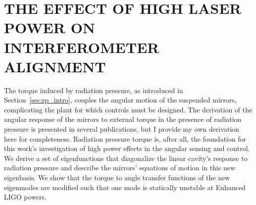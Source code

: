 \chapter{THE EFFECT OF HIGH LASER POWER ON INTERFEROMETER ALIGNMENT}
\label{ch:eigenmodes}



The torque induced by radiation pressure, as introduced in
Section~\ref{sec:rp_intro}, couples the angular motion of the suspended
mirrors, complicating the plant for which controls must be
designed. The derivation of the angular response of the mirrors to
external torque in the presence of radiation pressure is presented in
several publications, but I provide my own derivation here for
completeness. Radiation pressure torque is, after all, the foundation
for this work's investigation of high power effects in the angular
sensing and control. We derive a set of eigenfunctions that
diagonalize the linear cavity's response to radiation pressure and
describe the mirrors' equations of motion in this new eigenbasis. We
show that the torque to angle transfer functions of the new eigenmodes
are modified such that one mode is statically unstable at Enhanced
LIGO powers.






